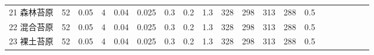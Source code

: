 \begin{sidewaystable}[]
\begin{tabular}{@{}lccccccccccccccccccc@{}}
    21 森林苔原    & 52                                                                & 0.05                                                                                                   & 4                                                                                  & 0.04                                                                               & 0.025                                                               & 0.3                                                       & 0.2                                                       & 1.3                                                       & 328                                                             & 298                                                             & 313                                                              & 288                                                               & 0.5                                                          \\
    22 混合苔原    & 52                                                                & 0.05                                                                                                   & 4                                                                                  & 0.04                                                                               & 0.025                                                               & 0.3                                                       & 0.2                                                       & 1.3                                                       & 328                                                             & 298                                                             & 313                                                              & 288                                                               & 0.5                                                          \\
    23 裸土苔原    & 52                                                                & 0.05                                                                                                   & 4                                                                                  & 0.04                                                                               & 0.025                                                               & 0.3                                                       & 0.2                                                       & 1.3                                                       & 328                                                             & 298                                                             & 313                                                              & 288                                                               & 0.5                                                          \\

\end{tabular}
\end{sidewaystable}
